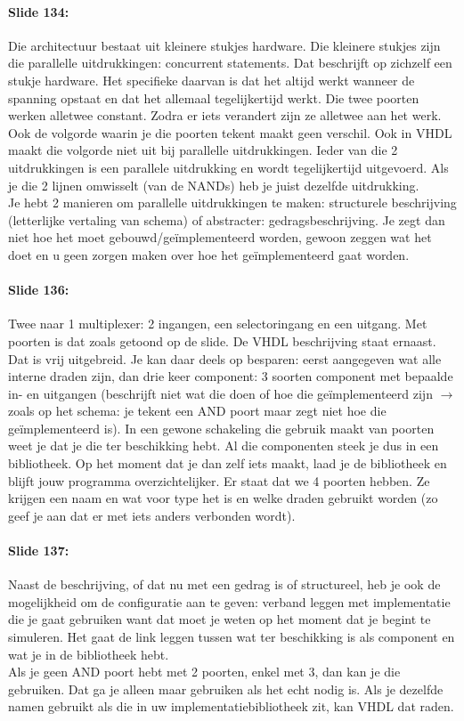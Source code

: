 \documentclass[10pt,a4paper]{book}
\begin{document}
\paragraph{Slide 134:} Die architectuur bestaat uit kleinere stukjes hardware. Die kleinere stukjes zijn die parallelle uitdrukkingen: concurrent statements. Dat beschrijft op zichzelf een stukje hardware. Het specifieke daarvan is dat het altijd werkt wanneer de spanning opstaat en dat het allemaal tegelijkertijd werkt. Die twee poorten werken alletwee constant. Zodra er iets verandert zijn ze alletwee aan het werk. Ook de volgorde waarin je die poorten tekent maakt geen verschil. Ook in VHDL maakt die volgorde niet uit bij parallelle uitdrukkingen. Ieder van die 2 uitdrukkingen is een parallele uitdrukking en wordt tegelijkertijd uitgevoerd. Als je die 2 lijnen omwisselt (van de NANDs) heb je juist dezelfde uitdrukking.\\
Je hebt 2 manieren om parallelle uitdrukkingen te maken: structurele beschrijving (letterlijke vertaling van schema) of abstracter: gedragsbeschrijving. Je zegt dan niet hoe het moet gebouwd/ge\"implementeerd worden, gewoon zeggen wat het doet en u geen zorgen maken over hoe het ge\"implementeerd gaat worden. 

\paragraph{Slide 136:} Twee naar 1 multiplexer: 2 ingangen, een selectoringang en een uitgang. Met poorten is dat zoals getoond op de slide. De VHDL beschrijving staat ernaast. Dat is vrij uitgebreid. Je kan daar deels op besparen: eerst aangegeven wat alle interne draden zijn, dan drie keer component: 3 soorten component met bepaalde in- en uitgangen (beschrijft niet wat die doen of hoe die ge\"implementeerd zijn $\rightarrow$ zoals op het schema: je tekent een AND poort maar zegt niet hoe die ge\"implementeerd is). In een gewone schakeling die gebruik maakt van poorten weet je dat je die ter beschikking hebt. Al die componenten steek je dus in een bibliotheek. Op het moment dat je dan zelf iets maakt, laad je de bibliotheek en blijft jouw programma overzichtelijker. Er staat dat we 4 poorten hebben. Ze krijgen een naam en wat voor type het is en welke draden gebruikt worden (zo geef je aan dat er met iets anders verbonden wordt). 

\paragraph{Slide 137:} Naast de beschrijving, of dat nu met een gedrag is of structureel, heb je ook de mogelijkheid om de configuratie aan te geven: verband leggen met implementatie die je gaat gebruiken want dat moet je weten op het moment dat je begint te simuleren. Het gaat de link leggen tussen wat ter beschikking is als component en wat je in de bibliotheek hebt.\\
Als je geen AND poort hebt met 2 poorten, enkel met 3, dan kan je die gebruiken. Dat ga je alleen maar gebruiken als het echt nodig is. Als je dezelfde namen gebruikt als die in uw implementatiebibliotheek zit, kan VHDL dat raden.
\end{document}
